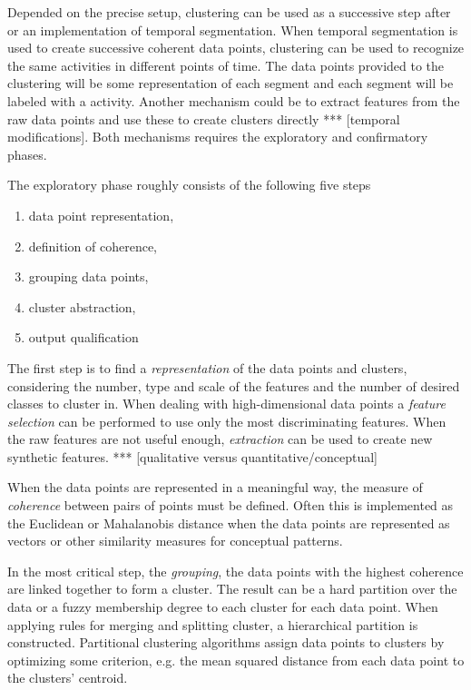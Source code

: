 Depended on the precise setup, clustering can be used as a successive step 
after or an implementation of temporal segmentation. When temporal 
segmentation is used to create successive coherent data points, clustering can 
be used to recognize the same activities in different points of time. The data 
points provided to the clustering will be some representation of each segment 
and each segment will be labeled with a activity. Another mechanism could be 
to extract features from the raw data points and use these to create clusters 
directly *** [temporal modifications]. Both mechanisms requires the 
exploratory and confirmatory phases.

The exploratory phase roughly consists of the following five steps 
\cite{jain1999data}
\begin{enumerate}
	\item data point representation,
	\item definition of coherence,
	\item grouping data points,
	\item cluster abstraction,
	\item output qualification
\end{enumerate}

The first step is to find a \emph{representation} of the data points and 
clusters, considering the number, type and scale of the features and the 
number of desired classes to cluster in. When dealing with high-dimensional 
data points a \emph{feature selection} can be performed to use only the most 
discriminating features. When the raw features are not useful enough, 
\emph{extraction} can be used to create new synthetic features. *** 
[qualitative versus quantitative/conceptual]

When the data points are represented in a meaningful way, the measure of 
\emph{coherence} between pairs of points must be defined. Often this is 
implemented as the Euclidean 
or Mahalanobis distance when the data points are represented as vectors or 
other similarity measures for conceptual patterns.

In the most critical step, the \emph{grouping}, the data points with the 
highest coherence are linked together to form a cluster. The result can be a 
hard partition over the data or a fuzzy membership degree to each cluster for 
each data point. When applying rules for merging and splitting cluster, a 
hierarchical partition is constructed. Partitional clustering algorithms 
assign data points to clusters by optimizing some criterion, e.g. the mean 
squared distance from each data point to the clusters' centroid.

